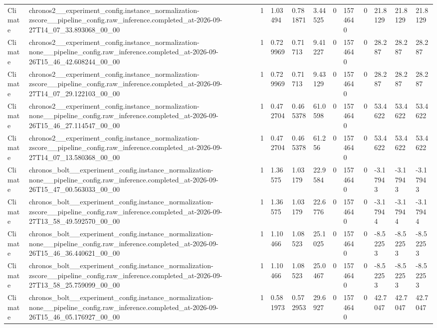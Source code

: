 \begin{tabular}{llllllllllll}
Climate & chronos2\_\_experiment\_config.instance\_normalization-zscore\_\_pipeline\_config.raw\_inference.completed\_at-2026-09-27T14\_07\_33.893068\_00\_00 & 1 & 1.03494 & 0.781871 & 3.44525 & 0 & 1574640 & 0 & 21.8129 & 21.8129 & 21.8129 \\
Climate & chronos2\_\_experiment\_config.instance\_normalization-none\_\_pipeline\_config.raw\_inference.completed\_at-2026-09-26T15\_46\_42.608244\_00\_00 & 1 & 0.729969 & 0.71713 & 9.41227 & 0 & 1574640 & 0 & 28.287 & 28.287 & 28.287 \\
Climate & chronos2\_\_experiment\_config.instance\_normalization-zscore\_\_pipeline\_config.raw\_inference.completed\_at-2026-09-27T14\_07\_29.122103\_00\_00 & 1 & 0.729969 & 0.71713 & 9.43129 & 0 & 1574640 & 0 & 28.287 & 28.287 & 28.287 \\
Climate & chronos2\_\_experiment\_config.instance\_normalization-none\_\_pipeline\_config.raw\_inference.completed\_at-2026-09-26T15\_46\_27.114547\_00\_00 & 1 & 0.472704 & 0.465378 & 61.0598 & 0 & 1574640 & 0 & 53.4622 & 53.4622 & 53.4622 \\
Climate & chronos2\_\_experiment\_config.instance\_normalization-zscore\_\_pipeline\_config.raw\_inference.completed\_at-2026-09-27T14\_07\_13.580368\_00\_00 & 1 & 0.472704 & 0.465378 & 61.256 & 0 & 1574640 & 0 & 53.4622 & 53.4622 & 53.4622 \\
Climate & chronos\_bolt\_\_experiment\_config.instance\_normalization-none\_\_pipeline\_config.raw\_inference.completed\_at-2026-09-26T15\_47\_00.563033\_00\_00 & 1 & 1.36575 & 1.03179 & 22.9584 & 0 & 1574640 & 0 & -3.17943 & -3.17943 & -3.17943 \\
Climate & chronos\_bolt\_\_experiment\_config.instance\_normalization-zscore\_\_pipeline\_config.raw\_inference.completed\_at-2026-09-27T13\_58\_49.592570\_00\_00 & 1 & 1.36575 & 1.03179 & 22.6776 & 0 & 1574640 & 0 & -3.17944 & -3.17944 & -3.17944 \\
Climate & chronos\_bolt\_\_experiment\_config.instance\_normalization-none\_\_pipeline\_config.raw\_inference.completed\_at-2026-09-26T15\_46\_36.440621\_00\_00 & 1 & 1.10466 & 1.08523 & 25.1025 & 0 & 1574640 & 0 & -8.52253 & -8.52253 & -8.52253 \\
Climate & chronos\_bolt\_\_experiment\_config.instance\_normalization-zscore\_\_pipeline\_config.raw\_inference.completed\_at-2026-09-27T13\_58\_25.759099\_00\_00 & 1 & 1.10466 & 1.08523 & 25.0467 & 0 & 1574640 & 0 & -8.52253 & -8.52253 & -8.52253 \\
Climate & chronos\_bolt\_\_experiment\_config.instance\_normalization-none\_\_pipeline\_config.raw\_inference.completed\_at-2026-09-26T15\_46\_05.176927\_00\_00 & 1 & 0.581973 & 0.572953 & 29.6927 & 0 & 1574640 & 0 & 42.7047 & 42.7047 & 42.7047 \\

\end{tabular}
